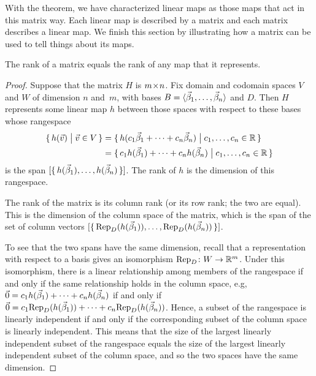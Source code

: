 With the theorem, we have characterized linear maps as
those maps that act in this matrix way.
Each linear map is described by a matrix and each matrix describes a 
linear map.
We finish this section by illustrating how a matrix can be used to tell things
about its maps.

\begin{theorem} \label{th:RankMatEqRankMap}
The rank of a matrix equals the rank of any map that it represents.
\end{theorem}

\begin{proof}
Suppose that the matrix \( H \) is \( \nbym{m}{n} \). 
Fix domain and codomain spaces $V$ and $W$ of dimension $n$ and~$m$, with
bases \( B=\sequence{\vec{\beta}_1,\dots,\vec{\beta}_n} \) and \( D \).
Then \( H \) represents some linear map $h$ between those spaces with respect 
to these bases whose rangespace
\begin{align*}
  \set{h(\vec{v})\suchthat \vec{v}\in V}
  &=\set{h(c_1\vec{\beta}_1+\dots+c_n\vec{\beta}_n)  
           \suchthat c_1,\dots,c_n\in\Re}                    \\
  &=\set{c_1h(\vec{\beta}_1)+\dots+c_nh(\vec{\beta}_n)
            \suchthat c_1,\dots,c_n\in\Re}
\end{align*}
is the span $\spanof{\set{h(\vec{\beta}_1),\dots,h(\vec{\beta}_n)}}$.
The rank of $h$ is the dimension of this rangespace.

The rank of the matrix is its column rank (or its row rank; the two are equal).
This is the dimension of the column space of the matrix, which is the span of
the set of column vectors 
$\spanof{\set{\rep{h(\vec{\beta}_1)}{D},\dots,\rep{h(\vec{\beta}_n)}{D}}}$.

To see that the two spans have the same dimension, recall that a
representation with respect to a basis gives an isomorphism 
$\map{\mbox{Rep}_D}{W}{\Re^m}$.
Under this isomorphism, there is a linear relationship among members of the
rangespace if and only if the same relationship holds in the
column space, e.g,
$\zero=c_1h(\vec{\beta}_1)+\dots+c_nh(\vec{\beta}_n)$ if and only if
$\zero=c_1\rep{h(\vec{\beta}_1)}{D}+\dots+c_n\rep{h(\vec{\beta}_n)}{D}$.
Hence, a subset of the rangespace is linearly independent if and only if the
corresponding subset of the column space is linearly independent.
This means that the size of the largest linearly independent subset of the
rangespace equals the size of the largest linearly independent subset of the
column space, and so the two spaces have the same dimension.
\end{proof}

